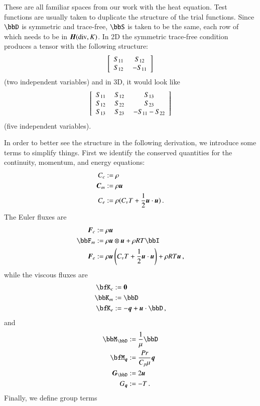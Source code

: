 \documentclass[preprint,12pt]{elsarticle}
\begin{document}
These are all familiar spaces from our work with the heat equation.
Test functions are usually taken to duplicate the structure of the trial functions.
Since $\bbD$ is symmetric and trace-free, $\bbS$ is taken to be the same, each row of which needs to be in $\mbox{\boldmath $H$}(\text{div},K)$.
In 2D the symmetric trace-free condition produces a tensor with the following structure:
\begin{equation*}
\left[ \begin{array}{cc} S_{11}\; & S_{12}\\ S_{12}\; & -S_{11}\\ \end{array} \right]
\end{equation*}
(two independent variables) and in 3D, it would look like
\begin{equation*}
\left[ \begin{array}{ccc} S_{11}\; & S_{12}\; & S_{13}\\ S_{12}\; & S_{22}\; & S_{23}\\ S_{13}\; & S_{23}\; & -S_{11}-S_{22}\\ \end{array} \right]
\end{equation*}
(five independent variables).

In order to better see the structure in the following derivation, we introduce some terms to simplify things.
First we identify the conserved quantities for the continuity, momentum, and energy equations:
\begin{align*}
C_c&:=\rho\\
\boldsymbol C_m&:=\rho\boldsymbol u\\
C_e&:=\rho(C_v T+\frac{1}{2}\boldsymbol u\cdot\boldsymbol u)\,.
\end{align*}
The Euler fluxes are
\begin{align*}
\bfF_c&:=\rho\bfu\\
\bbF_m&:=\rho\bfu\otimes\bfu+\rho RT\bbI\\
\bfF_e&:=\rho\bfu\LRp{C_v T+\frac{1}{2}\bfu\cdot\bfu}+\rho RT\bfu\,,
\end{align*}
while the viscous fluxes are
\begin{align*}
\bfK_c&:=\boldsymbol 0\\
\bbK_m&:=\bbD\\
\bfK_e&:=-\bfq+\bfu\cdot\bbD\,,
\end{align*}
and 
\begin{align*}
\bbM_{\bbD}&:=\frac{1}{\mu}\bbD\\
\bfM_{\bfq}&:=\frac{Pr}{C_p\mu}\bfq\\
\bfG_{\bbD}&:=2\bfu\\
G_{\bfq}&:=-T\,.
\end{align*}
Finally, we define group terms
\end{document}
